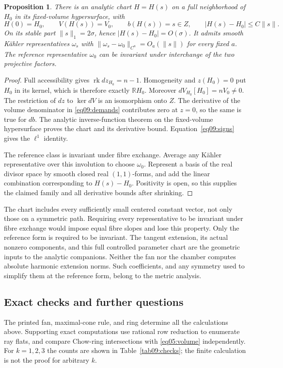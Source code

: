 \documentclass[11pt]{amsart}
\newtheorem{proposition}[theorem]{Proposition}
\theoremstyle{definition}
\theoremstyle{remark}
\newcommand{\RR}{\mathbb R}
\newcommand{\rk}{\operatorname{rk}}
\begin{document}
\begin{proposition}\label{prop09:chart}
There is an analytic chart \(H=H(s)\) on a full neighborhood of
\(H_0\) in its fixed-volume hypersurface, with
\begin{equation}\label{eq09:chart}
 H(0)=H_0,\qquad V(H(s))=V_0,
 \qquad b(H(s))=s\in Z,\qquad |H(s)-H_0|\le C\|s\|.
\end{equation}
On its stable part \(\|s\|_1=2\sigma\), hence
\(|H(s)-H_0|=O(\sigma)\). It admits smooth Kähler representatives
\(\omega_s\) with \(\|\omega_s-\omega_0\|_{C^a}=O_a(\|s\|)\)
for every fixed \(a\). The reference representative \(\omega_0\)
can be invariant under interchange of the two projective factors.
\end{proposition}

\begin{proof}
Full accessibility gives \(\rk dz_{H_0}=n-1\). Homogeneity and
\(z(H_0)=0\) put \(H_0\) in its kernel, which is therefore
exactly \(\RR H_0\). Moreover \(dV_{H_0}[H_0]=nV_0\ne0\).
The restriction of \(dz\) to \(\ker dV\) is an isomorphism onto
\(Z\). The derivative of the volume denominator in
\eqref{eq09:demands} contributes zero at \(z=0\), so the same
is true for \(db\). The analytic inverse-function theorem on the
fixed-volume hypersurface proves the chart and its derivative bound.
Equation~\eqref{eq09:signs} gives the \(\ell^1\) identity.

The reference class is invariant under fibre exchange. Average any
Kähler representative over this involution to choose \(\omega_0\).
Represent a basis of the real divisor space by smooth closed real
\((1,1)\)-forms, and add the linear combination corresponding to
\(H(s)-H_0\). Positivity is open, so this supplies the claimed
family and all derivative bounds after shrinking.
\end{proof}

The chart includes every sufficiently small centered constant vector,
not only those on a symmetric path. Requiring every representative to be invariant
under fibre exchange would impose equal fibre slopes and lose this
property. Only the reference form is required to be invariant.
The tangent extension, its actual nonzero components, and this full
controlled parameter chart are the geometric inputs to the analytic
companions. Neither the fan nor the chamber computes absolute
harmonic extension norms. Such coefficients, and any symmetry used to
simplify them at the reference form, belong to the metric analysis.

\subsection*{Exact checks and further questions}
The printed fan, maximal-cone rule, and ring determine all the
calculations above. Supporting exact computations use rational row
reduction to enumerate ray flats, and compare Chow-ring intersections
with \eqref{eq05:volume} independently. For \(k=1,2,3\) the counts
are shown in Table~\ref{tab09:checks}; the finite calculation is
not the proof for arbitrary \(k\).
\end{document}
